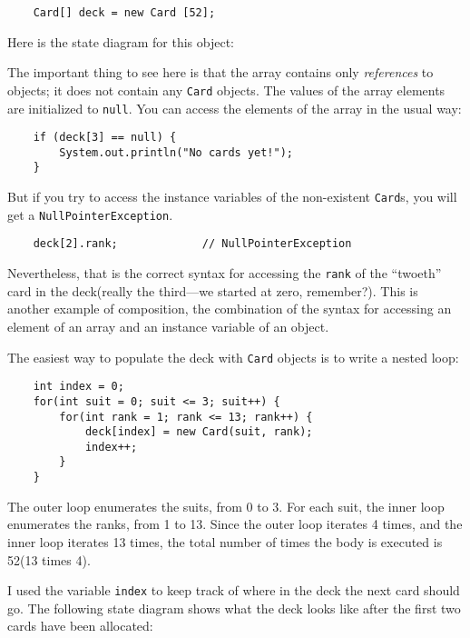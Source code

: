 \documentclass{book}
\newcommand{\beforefig}{\vspace{1.3\parskip}}
\newcommand{\afterfig}{\vspace{-0.2\parskip}}
\newcommand{\myfig}[1]{
    \beforefig
    \centerline{\epsfig{#1,scale=0.8}}
    \afterfig
}
\begin{document}
\begin{verbatim}
    Card[] deck = new Card [52];
\end{verbatim}

Here is the state diagram for this object:


\myfig{figure=figs/cardarray.eps}

The important thing to see here is that the array contains
only {\em references} to objects; it does not contain any
{\tt Card} objects.  The values of the array elements are
initialized to {\tt null}.  You can access the elements of
the array in the usual way:

\begin{verbatim}
    if (deck[3] == null) {
        System.out.println("No cards yet!");
    }
\end{verbatim}
%
But if you try to access the instance variables of the
non-existent {\tt Card}s, you will get a {\tt NullPointerException}.


\begin{verbatim}
    deck[2].rank;             // NullPointerException
\end{verbatim}
%
Nevertheless, that is the correct syntax for accessing the {\tt rank}
of the ``twoeth'' card in the deck(really the third---we started
at zero, remember?).  This is another example of composition, the
combination of the syntax for accessing an element of an array
and an instance variable of an object.


The easiest way to populate the deck with {\tt Card} objects
is to write a nested loop:

\begin{verbatim}
    int index = 0;
    for(int suit = 0; suit <= 3; suit++) {
        for(int rank = 1; rank <= 13; rank++) {
            deck[index] = new Card(suit, rank);
            index++;
        }
    }
\end{verbatim}
%
The outer loop enumerates the suits, from 0 to 3.  For
each suit, the inner loop enumerates the ranks, from 1
to 13.  Since the outer loop iterates 4 times, and
the inner loop iterates 13 times, the total number of times
the body is executed is 52(13 times 4).


I used the variable {\tt index} to keep track of where in the
deck the next card should go.  The following state diagram
shows what the deck looks like after the first two cards
have been allocated:
\end{document}
